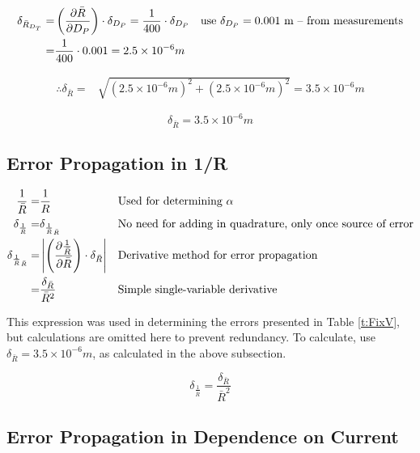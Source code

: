 \documentclass[12pt]{article}
\newcommand{\paren}[1]{\left( {#1} \right)}
\newcommand{\abs}[1]{\left| {#1} \right|}
\begin{document}
\begin{align}
	\delta_{\bar{R}_{D_T}} =& \left( \frac{\partial \bar{R}}{\partial D_P} \right)\cdot\delta_{D_P} = \frac{1}{400}\cdot\delta_{D_P} && \text{use }\delta_{D_P}=0.001\text{ m -- from measurements} \label{e:R_err_Dp} \\
	=& \frac{1}{400}\cdot0.001=2.5\times10^{-6} m \notag
\end{align}

\begin{align*}
	\therefore \delta_{\bar{R}} =& \sqrt{(2.5\times10^{-6}m)^2+ (2.5\times10^{-6}m)^2} = 3.5\times10^{-6} m 
\end{align*}

\begin{equation}
	\delta_{\bar{R}} = 3.5\times10^{-6} m
	\label{v:R_bar_err}
\end{equation}

\subsection{Error Propagation in 1/R} \label{sec:InvRadiusError}

\begin{align}
	\frac{1}{\bar{R}}=& \frac{1}{R} && \text{Used for determining }\alpha \notag \\
	\delta_{\frac{1}{\bar{R}}} =& \delta_{\frac{1}{\bar{R}}_{\bar{R}}} && \text{No need for adding in quadrature, only once source of error} \notag \\
	\delta_{\frac{1}{\bar{R}}_{\bar{R}}} =& \abs{\paren{\frac{\partial \frac{1}{\bar{R}}}{\partial \bar{R}}}\cdot\delta_{\bar{R}}} && \text{Derivative method for error propagation} \label{e:R_inv_err} \\
	=& \frac{\delta_{\bar{R}}}{\bar{R}^2} && \text{Simple single-variable derivative} \notag
\end{align}

This expression was used in determining the errors presented in Table \ref{t:FixV}, but calculations are omitted here to prevent redundancy. To calculate, use $\delta_{\bar{R}}=3.5\times10^{-6} m$, as calculated in the above subsection.

\begin{equation}
	\delta_{\frac{1}{\bar{R}}}=\frac{\delta_{\bar{R}}}{\bar{R}^2}
	\label{e:R_bar_inverse_err}
\end{equation}

\clearpage

\subsection{Error Propagation in Dependence on Current} \label{sec:FixedVoltageErr}
\end{document}
